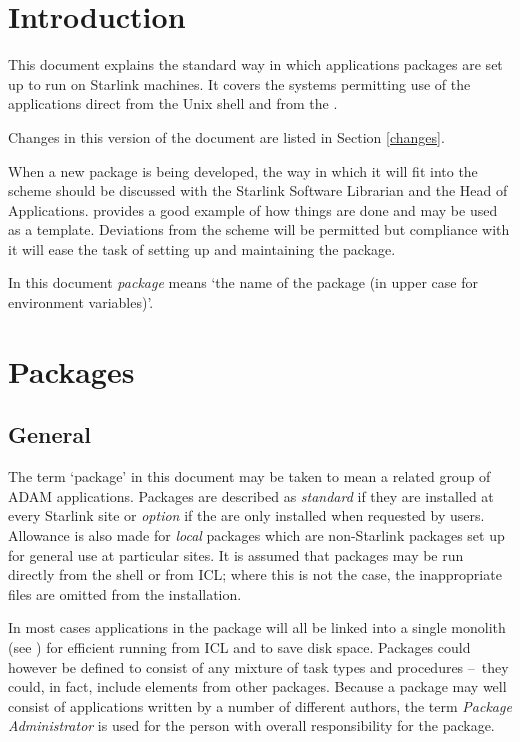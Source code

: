 \documentclass[twoside,11pt,nolof]{starlink}
\providecommand{\dash}{--}
\begin{document}
\scfrontmatter


\section{Introduction}
This document explains the standard way in which
 applications packages
are set up to run on Starlink machines. It covers the systems permitting
use of the applications direct from the Unix shell and from the
.

Changes in this version of the document are listed in Section \ref{changes}.

When a new package is being developed, the way in which it will fit into the
scheme should be discussed with the Starlink Software Librarian and the Head
of Applications.
provides a good example of how things are done and may be used as a template.
Deviations from the scheme will be permitted but compliance with it will ease
the task of setting up and maintaining the package.

In this document  \textit{package} means
`the name of the package (in upper case for environment variables)'.

\section{Packages}
\subsection{General}
\label{pack_gen}
The term `package' in this document may be taken to mean a related group of
ADAM applications. Packages are described as \textit{standard} if they are
installed at every Starlink site or \textit{option} if the are only installed
when requested by users.
Allowance is also
made for \textit{local}\/ packages which are non-Starlink packages set up for
general use at particular sites.
It is assumed that packages may be run directly from the shell or from ICL;
where this is not the case, the inappropriate files are omitted from the
installation.

In most cases applications in the package will all be linked into a single
monolith (see
) for efficient running from ICL and to save
disk space.
Packages could however be defined to consist of any mixture of task types
and procedures \dash\ they could, in fact, include elements from other packages.
Because a package may well consist of applications written by a number of
different authors, the term \textit{Package Administrator} is used for the
person with overall responsibility for the package.
\end{document}

